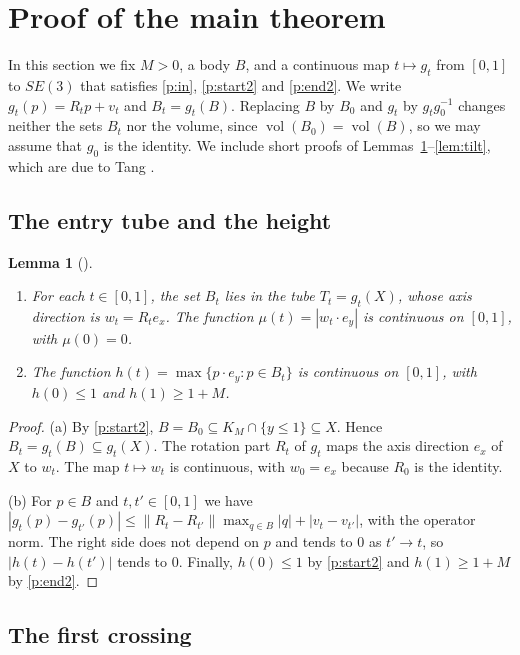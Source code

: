 \documentclass[11pt]{amsart}
\newtheorem{lemma}[theorem]{Lemma}
\theoremstyle{definition}
\theoremstyle{remark}
\numberwithin{equation}{section}
\newcommand{\vol}{\operatorname{vol}}
\begin{document}
\section{Proof of the main theorem}\label{sec:proof}

In this section we fix $M>0$, a body $B$, and a continuous map $t\mapsto g_t$ from $[0,1]$ to $SE(3)$ that satisfies \ref{p:in}, \ref{p:start2} and \ref{p:end2}. We write $g_t(p)=R_tp+v_t$ and $B_t=g_t(B)$. Replacing $B$ by $B_0$ and $g_t$ by $g_tg_0^{-1}$ changes neither the sets $B_t$ nor the volume, since $\vol(B_0)=\vol(B)$, so we may assume that $g_0$ is the identity. We include short proofs of Lemmas~\ref{lem:entry}--\ref{lem:tilt}, which are due to Tang \cite{Tan26a}.

\subsection{The entry tube and the height}

\begin{lemma}[{\cite[Lemmas~3.2 and~3.3]{Tan26a}}]\label{lem:entry}
\begin{enumerate}[label=(\alph*)]
\item For each $t\in[0,1]$, the set $B_t$ lies in the tube $T_t=g_t(X)$, whose axis direction is $w_t=R_te_x$. The function $\mu(t)=|w_t\cdot e_y|$ is continuous on $[0,1]$, with $\mu(0)=0$.
\item The function $h(t)=\max\{p\cdot e_y:p\in B_t\}$ is continuous on $[0,1]$, with $h(0)\le1$ and $h(1)\ge1+M$.
\end{enumerate}
\end{lemma}

\begin{proof}
(a) By \ref{p:start2}, $B=B_0\subseteq K_M\cap\{y\le1\}\subseteq X$. Hence $B_t=g_t(B)\subseteq g_t(X)$. The rotation part $R_t$ of $g_t$ maps the axis direction $e_x$ of $X$ to $w_t$. The map $t\mapsto w_t$ is continuous, with $w_0=e_x$ because $R_0$ is the identity.

(b) For $p\in B$ and $t,t'\in[0,1]$ we have $|g_t(p)-g_{t'}(p)|\le\|R_t-R_{t'}\|\max_{q\in B}|q|+|v_t-v_{t'}|$, with the operator norm. The right side does not depend on $p$ and tends to $0$ as $t'\to t$, so $|h(t)-h(t')|$ tends to $0$. Finally, $h(0)\le1$ by \ref{p:start2} and $h(1)\ge1+M$ by \ref{p:end2}.
\end{proof}

\subsection{The first crossing}
\end{document}
